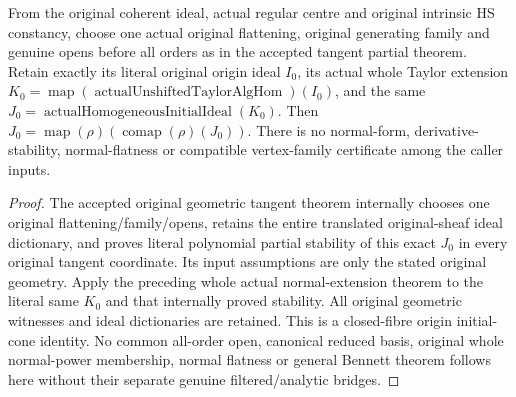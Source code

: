 \begin{theorem}
\label{hir:actual-original-hs-centre-whole-initial-normal-extension}
\leanok
From the original coherent ideal, actual regular centre and original
intrinsic HS constancy, choose one actual original flattening,
original generating family and genuine opens before all orders as
in the accepted tangent partial theorem. Retain exactly its literal
original origin ideal $I_0$, its actual whole Taylor extension
$K_0=\operatorname{map}(\operatorname{actualUnshiftedTaylorAlgHom})(I_0)$,
and the same $J_0=\operatorname{actualHomogeneousInitialIdeal}(K_0)$.
Then $J_0=\operatorname{map}(\rho)(\operatorname{comap}(\rho)(J_0))$.
There is no normal-form, derivative-stability, normal-flatness or
compatible vertex-family certificate among the caller inputs.
\end{theorem}
\begin{proof}
The accepted original geometric tangent theorem internally chooses
one original flattening/family/opens, retains the entire translated
original-sheaf ideal dictionary, and proves literal polynomial
partial stability of this exact $J_0$ in every original tangent
coordinate. Its input assumptions are only the stated original
geometry. Apply the preceding whole actual normal-extension theorem
to the literal same $K_0$ and that internally proved stability.
All original geometric witnesses and ideal dictionaries are retained.
This is a closed-fibre origin initial-cone identity. No common
all-order open, canonical reduced basis, original whole normal-power
membership, normal flatness or general Bennett theorem follows here
without their separate genuine filtered/analytic bridges.
\end{proof}
